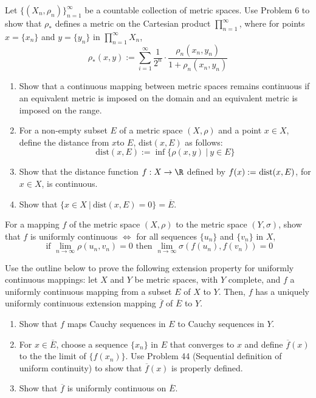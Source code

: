 \begin{problem}
	Let \( \{ (X_n, \rho_n) \}_{n=1}^\infty \) be a countable collection of metric spaces. Use Problem 6 to show that \( \rho_* \) defines a metric on the Cartesian product \( \prod_{n=1}^\infty \), where for points \( x=\{x_n \} \) and \( y= \{ y_n \} \) in \( \prod_{n=1}^\infty X_n \), 
	\[
		\rho_* (x,y) := \sum_{i=1}^\infty \frac{1}{2^n} \cdot \frac{\rho_n(x_n, y_n)}{1+\rho_n(x_n, y_n)}
	\]
\end{problem}

\begin{problem}
	\begin{enumerate}[a]
		\item Show that a continuous mapping between metric spaces remains continuous if an equivalent metric is imposed on the domain and an equivalent metric is imposed on the range. 
		\item For a non-empty subset \( E \) of a metric space \( (X, \rho) \) and a point \( x \in X \), define the distance from \( x \)to \( E \), dist\( (x,E) \) as follows: 
		\[
			\text{dist}(x,E) := \inf \{ \rho(x,y)\ |\ y \in E \} 
		\]
		\item Show that the distance function \( f: X \rightarrow \R \) defined by \( f(x):= $ dist$(x,E) \), for \( x \in X \), is continuous. 
		\item Show that \( \{ x \in X\ |\ \text{dist}(x, E) = 0 \} = \overline{E} \). 
	\end{enumerate}
\end{problem}

\begin{problem}
	For a mapping \( f \) of the metric space \( (X, \rho) \) to the metric space \( (Y, \sigma) \), show that \( f \) is uniformly continuous \( \iff\)  for all sequences \( \{ u_n \} \) and \( \{ v_n \} \) in \( X \), 
	\[
		\text{ if } \lim_{n \rightarrow \infty} \rho(u_n, v_n) = 0 \text{ then } \lim_{n \rightarrow \infty} \sigma( f(u_n), f(v_n)) = 0 
	\]
\end{problem}

\begin{problem}
	Use the outline below to prove the following extension property for uniformly continuous mappings: let \(X \) and \( Y \) be metric spaces, with \( Y \) complete, and \( f \) a uniformly continuous mapping from a subset \( E \) of \( X \) to \( Y \). Then, \( f \) has a uniquely uniformly continuous extension mapping $\overline{f}$ of $\overline{E}$ to $Y$. 
	\begin{enumerate}[a]
		\item Show that \( f \) maps Cauchy sequences in \( E \) to Cauchy sequences in \( Y \). 
		\item For \( x \in \overline{E} \), choose a sequence \( \{ x_n \} \) in \( E \) that converges to \( x \) and define \( \overline{f}(x) \) to the the limit of \( \{ f(x_n) \} \). Use Problem 44 (Sequential definition of uniform continuity) to show that \( \overline{f}(x) \) is properly defined. 
		\item Show that \( \overline{f} \) is uniformly continuous on \( \overline{E} \). 
	\end{enumerate}
\end{problem}

